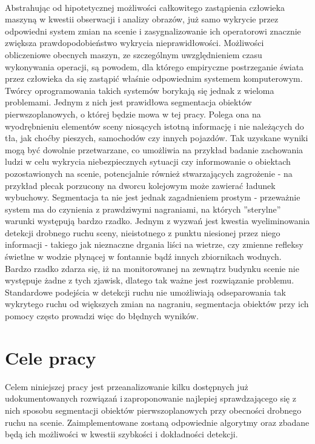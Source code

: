 \paragraph{}
Abstrahując od hipotetycznej możliwości całkowitego zastąpienia człowieka maszyną w kwestii obserwacji i analizy obrazów, już samo wykrycie przez odpowiedni system zmian na scenie i zasygnalizowanie ich operatorowi znacznie zwiększa prawdopodobieństwo wykrycia nieprawidłowości. Możliwości obliczeniowe obecnych maszyn, ze szczególnym uwzględnieniem czasu wykonywania operacji, są powodem, dla którego empiryczne postrzeganie świata przez człowieka da się zastąpić właśnie odpowiednim systemem komputerowym. Twórcy oprogramowania takich systemów borykają się jednak z wieloma problemami. Jednym z nich jest prawidłowa segmentacja obiektów pierwszoplanowych, o której będzie mowa w tej pracy. Polega ona na wyodrębnieniu elementów sceny niosących istotną informację i nie należących do tła, jak choćby pieszych, samochodów czy innych pojazdów. Tak uzyskane wyniki mogą być dowolnie przetwarzane, co umożliwia na przykład badanie zachowania ludzi w celu wykrycia niebezpiecznych sytuacji czy informowanie o obiektach pozostawionych na scenie, potencjalnie również stwarzających zagrożenie - na przykład plecak porzucony na dworcu kolejowym może zawierać ładunek wybuchowy. Segmentacja ta nie jest jednak zagadnieniem prostym - przeważnie system ma do czynienia z prawdziwymi nagraniami, na których ''sterylne'' warunki występują bardzo rzadko. Jednym z wyzwań jest kwestia wyeliminowania detekcji drobnego ruchu sceny, nieistotnego z punktu niesionej przez niego informacji - takiego jak nieznaczne drgania liści na wietrze, czy zmienne refleksy świetlne w wodzie płynącej w fontannie bądź innych zbiornikach wodnych. Bardzo rzadko zdarza się, iż na monitorowanej na zewnątrz budynku scenie nie występuje żadne z tych zjawisk, dlatego tak ważne jest rozwiązanie problemu. Standardowe podejścia w detekcji ruchu nie umożliwiają odseparowania tak wykrytego ruchu od większych zmian na nagraniu, segmentacja obiektów przy ich pomocy często prowadzi więc do błędnych wyników.


\section{Cele pracy}
\label{sec:celePracy}

Celem niniejszej pracy jest przeanalizowanie kilku dostępnych już udokumentowanych rozwiązań i\,zaproponowanie najlepiej sprawdzającego się z nich sposobu segmentacji obiektów pierwszoplanowych przy obecności drobnego ruchu na scenie. Zaimplementowane zostaną odpowiednie algorytmy oraz zbadane będą ich możliwości w kwestii szybkości i dokładności detekcji. 


